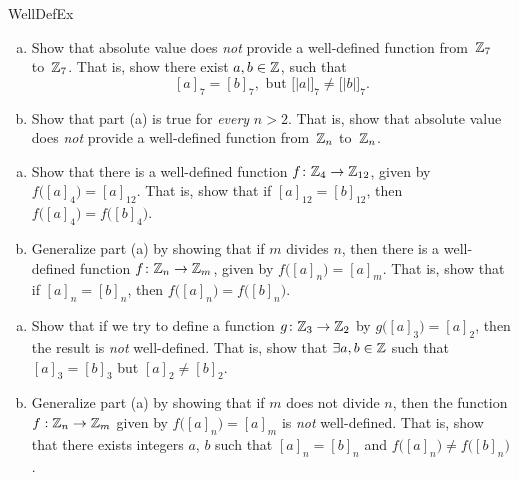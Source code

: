\begin{exercise}{WellDefEx}
\begin{enumerate}[(a)]
\item  \label{WellDefEx-AbsVal0}
 Show that absolute value does \emph{not} provide a well-defined function from~$\mathbb{Z}_7$ to~$\mathbb{Z}_7$. That is, show there exist $a,b \in \mathbb{Z}$, such that 
\[ [a]_7 = [b]_7, \text{ but } \bigl[ |a| \bigr]_7 \neq \bigl[ |b| \bigr]_7.\]
\item  \label{WellDefEx-AbsVal}
 Show that part (a) is true for \emph{every} $n > 2$. That is, show that  absolute value does \emph{not} provide a well-defined function from~$\mathbb{Z}_n$ to~$\mathbb{Z}_n$. 
\end{enumerate}
\end{exercise}

\begin{exercise}{57}
\begin{enumerate}[(a)]
\item
Show that there is a well-defined function 
$f \colon \mathbb{Z}_4 \to \mathbb{Z}_{12}$, given by \\
$ f \bigl( [a]_4 \bigr) = [a]_{12}$. 
That is, show that if $[a]_{12} = [b]_{12}$, then $f \bigl( [a]_4 \bigr) = f \bigl( [b]_4 \bigr)$.
\item  \label{WellDefEx-divide}
Generalize part (a) by showing that if $m$ divides $n$, then there is a well-defined function 
$f \colon \mathbb{Z}_n \to \mathbb{Z}_m$, given by $f \bigl( [a]_n \bigr) = [a]_m$.
That is, show that if $[a]_n = [b]_n$, then $f \bigl( [a]_n \bigr) = f \bigl( [b]_n \bigr)$.
\end{enumerate}
\end{exercise}

\begin{exercise}{}
\begin{enumerate}[(a)]
\item  \label{WellDefEx-odd2}
 Show that if we try to define a function $g \colon \mathbb{Z}_3 \to \mathbb{Z}_2$ by $g \bigl( [a]_3 \bigr) = [a]_2$, then the result is \emph{not} well-defined. That is, show that $\exists a, b \in \mathbb{Z}$ such that
$[a]_3 = [b]_3$  but $[a]_2 \neq [b]_2.$
\item
Generalize part (a) by showing that 
if $m$ does not divide $n$, then the function 
$f: \mathbb{Z}_n \to \mathbb{Z}_m$  given by $f \bigl( [a]_n \bigr) = [a]_m$ is \emph{not} well-defined.
That is, show that there exists integers $a$, $b$ such that $[a]_n = [b]_n$ and $f \bigl( [a]_n \bigr) \neq f \bigl( [b]_n \bigr)$.
\end{enumerate}
\end{exercise}


